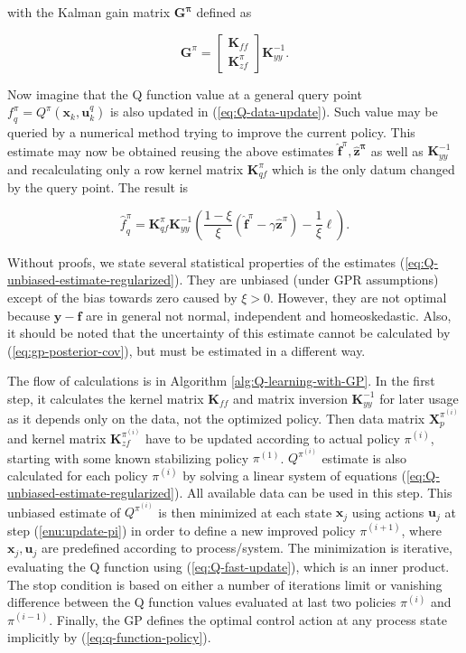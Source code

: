 \documentclass{ifacconf}
\begin{document}
\noindent with the Kalman gain matrix $\mathbf{G^{\pi}}$ defined
as 

\[
\mathbf{G}^{\pi}=\left[\begin{array}{c}
\mathbf{K}_{ff}\\
\mathbf{K}_{zf}^{\pi}
\end{array}\right]\mathbf{K}_{yy}^{-1}.
\]

\noindent  Now imagine that the Q function value at a general query
point $\mathbf{\mathit{f}}_{q}^{\pi}=Q^{\pi}(\mathbf{x}_{k},\mathbf{u}_{k}^{q})$
is also updated in (\ref{eq:Q-data-update}). Such value may be queried
by a numerical method trying to improve the current policy. This estimate
may now be obtained reusing the above estimates $\hat{\mathbf{f}}^{\pi},\mathbf{\hat{z}^{\pi}}$
as well as $\mathbf{K}_{yy}^{-1}$ and recalculating only a row kernel
matrix $\mathbf{K}_{qf}^{\pi}$ which is the only datum changed by
the query point. The result is

\begin{equation}
\mathbf{\hat{\mathit{f}}}_{q}^{\pi}=\mathbf{K}_{qf}^{\pi}\mathbf{K}_{yy}^{-1}\left(\frac{1-\xi}{\xi}\left(\hat{\mathbf{f}}^{\pi}-\gamma\mathbf{\hat{z}}^{\pi}\right)-\frac{1}{\xi}\boldsymbol{\ell}\right).\label{eq:Q-fast-update}
\end{equation}

\noindent Without proofs, we state several statistical properties
of the estimates (\ref{eq:Q-unbiased-estimate-regularized}). They are unbiased
(under GPR assumptions) except of the bias towards zero caused by
$\xi>0$. However, they are not optimal because $\mathbf{y}-\mathbf{f}$ are in general not
normal, independent and homeoskedastic. Also, it should be noted that
the uncertainty of this estimate cannot be calculated by (\ref{eq:gp-posterior-cov}),
but must be estimated in a different way.

The flow of calculations is in Algorithm \ref{alg:Q-learning-with-GP}.
In the first step, it calculates the kernel matrix $\mathbf{K}_{ff}$
and matrix inversion $\mathbf{K}_{yy}^{-1}$ for later usage as it
depends only on the data, not the optimized policy. Then data matrix
$\mathbf{X}_{p}^{\pi^{(i)}}$ and kernel matrix $\mathbf{K}_{zf}^{\pi^{(i)}}$
have to be updated according to actual policy $\pi^{(i)}$, starting
with some known stabilizing policy $\pi^{(1)}$. $Q^{\pi^{(i)}}$
estimate is also calculated for each policy $\pi^{(i)}$ by solving
a linear system of equations (\ref{eq:Q-unbiased-estimate-regularized}). All
available data can be used in this step. This unbiased estimate of
$Q^{\pi^{(i)}}$ is then minimized at each state $\mathbf{x}_{j}$
using actions $\mathbf{u}_{j}$ at step (\ref{enu:update-pi}) in
order to define a new improved policy $\pi^{(i+1)}$, where $\mathbf{x}_{j},\mathbf{u}_{j}$
are predefined according to process/system. The minimization is iterative,
evaluating the Q function using (\ref{eq:Q-fast-update}), which is
an inner product. The stop condition is based on either a number of
iterations limit or vanishing difference between the Q function values
evaluated at last two policies $\pi^{(i)}$ and $\pi^{(i-1)}$. Finally,
the GP defines the optimal control action at any process state implicitly
by (\ref{eq:q-function-policy}).
\end{document}
